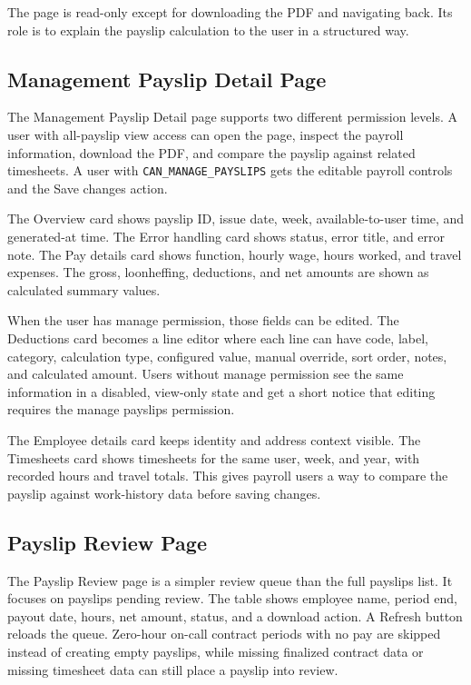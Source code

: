 \documentclass[11pt]{article}
\newcommand{\code}[1]{\nolinkurl{#1}}
\begin{document}
The page is read-only except for downloading the PDF and navigating back. Its role is to explain the payslip calculation to the user in a structured way.

\subsection{Management Payslip Detail Page}

The Management Payslip Detail page supports two different permission levels. A user with all-payslip view access can open the page, inspect the payroll information, download the PDF, and compare the payslip against related timesheets. A user with \code{CAN_MANAGE_PAYSLIPS} gets the editable payroll controls and the Save changes action.

The Overview card shows payslip ID, issue date, week, available-to-user time, and generated-at time. The Error handling card shows status, error title, and error note. The Pay details card shows function, hourly wage, hours worked, and travel expenses. The gross, loonheffing, deductions, and net amounts are shown as calculated summary values.

When the user has manage permission, those fields can be edited. The Deductions card becomes a line editor where each line can have code, label, category, calculation type, configured value, manual override, sort order, notes, and calculated amount. Users without manage permission see the same information in a disabled, view-only state and get a short notice that editing requires the manage payslips permission.

The Employee details card keeps identity and address context visible. The Timesheets card shows timesheets for the same user, week, and year, with recorded hours and travel totals. This gives payroll users a way to compare the payslip against work-history data before saving changes.
\subsection{Payslip Review Page}

The Payslip Review page is a simpler review queue than the full payslips list. It focuses on payslips pending review. The table shows employee name, period end, payout date, hours, net amount, status, and a download action. A Refresh button reloads the queue. Zero-hour on-call contract periods with no pay are skipped instead of creating empty payslips, while missing finalized contract data or missing timesheet data can still place a payslip into review.
\end{document}
